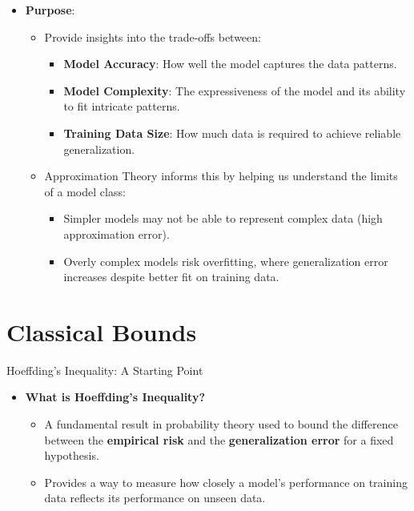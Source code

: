 \documentclass[
  ignorenonframetext,
]{beamer}
\providecommand{\tightlist}{%
  \setlength{\itemsep}{0pt}\setlength{\parskip}{0pt}}\usepackage{longtable,booktabs,array}
\begin{document}
\begin{frame}
\begin{itemize}
\tightlist
\item
  \textbf{Purpose}:

  \begin{itemize}
  \tightlist
  \item
    Provide insights into the trade-offs between:

    \begin{itemize}
    \tightlist
    \item
      \textbf{Model Accuracy}: How well the model captures the data
      patterns.
    \item
      \textbf{Model Complexity}: The expressiveness of the model and its
      ability to fit intricate patterns.
    \item
      \textbf{Training Data Size}: How much data is required to achieve
      reliable generalization.
    \end{itemize}
  \item
    Approximation Theory informs this by helping us understand the
    limits of a model class:

    \begin{itemize}
    \tightlist
    \item
      Simpler models may not be able to represent complex data (high
      approximation error).
    \item
      Overly complex models risk overfitting, where generalization error
      increases despite better fit on training data.
    \end{itemize}
  \end{itemize}
\end{itemize}
\end{frame}

\section{Classical Bounds}\label{classical-bounds}

\begin{frame}{Hoeffding's Inequality: A Starting Point}
\label{hoeffdings-inequality-a-starting-point}
\begin{itemize}
\tightlist
\item
  \textbf{What is Hoeffding's Inequality?}

  \begin{itemize}
  \tightlist
  \item
    A fundamental result in probability theory used to bound the
    difference between the \textbf{empirical risk} and the
    \textbf{generalization error} for a fixed hypothesis.
  \item
    Provides a way to measure how closely a model's performance on
    training data reflects its performance on unseen data.
  \end{itemize}
\end{itemize}
\end{frame}
\end{document}
